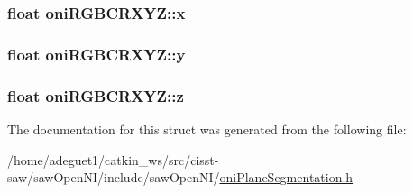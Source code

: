\hypertarget{structoni_r_g_b_c_r_x_y_z_a5cb3b825ea9f2744df1dbc90af7f8d26}{
\subsubsection[{x}]{\setlength{\rightskip}{0pt plus 5cm}float oni\-R\-G\-B\-C\-R\-X\-Y\-Z\-::x}}\label{structoni_r_g_b_c_r_x_y_z_a5cb3b825ea9f2744df1dbc90af7f8d26}
\hypertarget{structoni_r_g_b_c_r_x_y_z_a7359bd5770d4685c717c634451b33337}{
\subsubsection[{y}]{\setlength{\rightskip}{0pt plus 5cm}float oni\-R\-G\-B\-C\-R\-X\-Y\-Z\-::y}}\label{structoni_r_g_b_c_r_x_y_z_a7359bd5770d4685c717c634451b33337}
\hypertarget{structoni_r_g_b_c_r_x_y_z_aa4745113704723d9220f40f77d67df5c}{
\subsubsection[{z}]{\setlength{\rightskip}{0pt plus 5cm}float oni\-R\-G\-B\-C\-R\-X\-Y\-Z\-::z}}\label{structoni_r_g_b_c_r_x_y_z_aa4745113704723d9220f40f77d67df5c}


The documentation for this struct was generated from the following file\-:\begin{DoxyCompactItemize}
\item 
/home/adeguet1/catkin\-\_\-ws/src/cisst-\/saw/saw\-Open\-N\-I/include/saw\-Open\-N\-I/\hyperlink{oni_plane_segmentation_8h}{oni\-Plane\-Segmentation.\-h}\end{DoxyCompactItemize}
